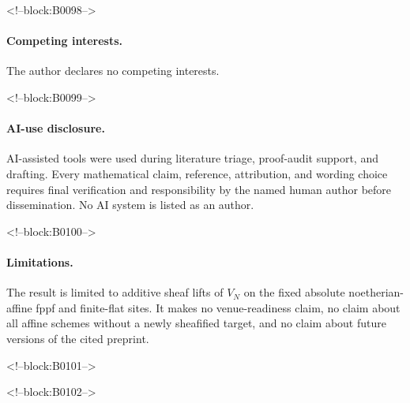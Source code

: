 \documentclass[11pt]{article}
\theoremstyle{definition}
\begin{document}
<!--block:B0098-->
\paragraph{Competing interests.}
The author declares no competing interests.

<!--block:B0099-->
\paragraph{AI-use disclosure.}
AI-assisted tools were used during literature triage, proof-audit support,
and drafting.  Every mathematical claim, reference, attribution, and
wording choice requires final verification and responsibility by the named
human author before dissemination.  No AI system is listed as an author.

<!--block:B0100-->
\paragraph{Limitations.}
The result is limited to additive sheaf lifts of \(V_N\) on the fixed
absolute noetherian-affine fppf and finite-flat sites.  It makes no
venue-readiness claim, no claim about all affine schemes without a newly
sheafified target, and no claim about future versions of the cited
preprint.

<!--block:B0101-->



<!--block:B0102-->
\end{document}
